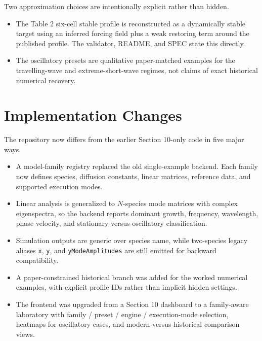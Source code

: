 \documentclass[11pt]{article}
\begin{document}
Two approximation choices are intentionally explicit rather than hidden.
\begin{itemize}
    \item The Table 2 six-cell stable profile is reconstructed as a dynamically stable target using an inferred forcing field plus a weak restoring term around the published profile. The validator, README, and SPEC state this directly.
    \item The oscillatory presets are qualitative paper-matched examples for the travelling-wave and extreme-short-wave regimes, not claims of exact historical numerical recovery.
\end{itemize}

\section*{Implementation Changes}
The repository now differs from the earlier Section 10-only code in five major ways.
\begin{itemize}
    \item A model-family registry replaced the old single-example backend. Each family now defines species, diffusion constants, linear matrices, reference data, and supported execution modes.
    \item Linear analysis is generalized to \(N\)-species mode matrices with complex eigenspectra, so the backend reports dominant growth, frequency, wavelength, phase velocity, and stationary-versus-oscillatory classification.
    \item Simulation outputs are generic over species name, while two-species legacy aliases \texttt{x}, \texttt{y}, and \texttt{yModeAmplitudes} are still emitted for backward compatibility.
    \item A paper-constrained historical branch was added for the worked numerical examples, with explicit profile IDs rather than implicit hidden settings.
    \item The frontend was upgraded from a Section 10 dashboard to a family-aware laboratory with family / preset / engine / execution-mode selection, heatmaps for oscillatory cases, and modern-versus-historical comparison views.
\end{itemize}
\end{document}
